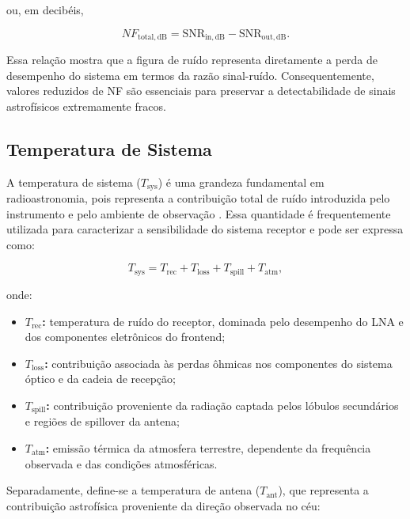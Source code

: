 ou, em decibéis,

\begin{equation}
NF_{\mathrm{total,dB}}
=
\mathrm{SNR}_{\mathrm{in,dB}}
-
\mathrm{SNR}_{\mathrm{out,dB}}.
\end{equation}

Essa relação mostra que a figura de ruído representa diretamente a perda de desempenho do sistema em termos da razão sinal-ruído. Consequentemente, valores reduzidos de NF são essenciais para preservar a detectabilidade de sinais astrofísicos extremamente fracos.

\subsection{Temperatura de Sistema}

A temperatura de sistema ($T_{\mathrm{sys}}$) é uma grandeza fundamental em radioastronomia, pois representa a contribuição total de ruído introduzida pelo instrumento e pelo ambiente de observação \cite{wilson2013tools}. Essa quantidade é frequentemente utilizada para caracterizar a sensibilidade do sistema receptor e pode ser expressa como:

\begin{equation}
T_{\mathrm{sys}}
=
T_{\mathrm{rec}}
+
T_{\mathrm{loss}}
+
T_{\mathrm{spill}}
+
T_{\mathrm{atm}},
\end{equation}

onde:

\begin{itemize}
    \item \textbf{$T_{\mathrm{rec}}$:} temperatura de ruído do receptor, dominada pelo desempenho do LNA e dos componentes eletrônicos do frontend;

    \item \textbf{$T_{\mathrm{loss}}$:} contribuição associada às perdas ôhmicas nos componentes do sistema óptico e da cadeia de recepção;

    \item \textbf{$T_{\mathrm{spill}}$:} contribuição proveniente da radiação captada pelos lóbulos secundários e regiões de spillover da antena;

    \item \textbf{$T_{\mathrm{atm}}$:} emissão térmica da atmosfera terrestre, dependente da frequência observada e das condições atmosféricas.
\end{itemize}

Separadamente, define-se a temperatura de antena ($T_{\mathrm{ant}}$), que representa a contribuição astrofísica proveniente da direção observada no céu:

